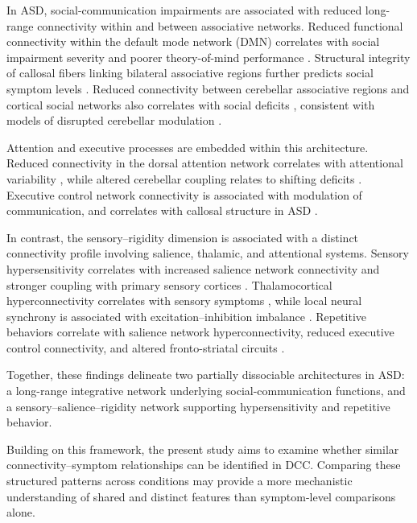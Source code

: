 \documentclass{article}
\begin{document}
In ASD, social-communication impairments are associated with reduced long-range connectivity within and between associative networks. Reduced functional connectivity within the default mode network (DMN) correlates with social impairment severity and poorer theory-of-mind performance \citep{Assaf2010,Elton2016}. Structural integrity of callosal fibers linking bilateral associative regions further predicts social symptom levels \citep{Dimond2019}. Reduced connectivity between cerebellar associative regions and cortical social networks also correlates with social deficits \citep{Ramos2019,Khan2015}, consistent with models of disrupted cerebellar modulation \citep{Belmonte2004}.

Attention and executive processes are embedded within this architecture. Reduced connectivity in the dorsal attention network correlates with attentional variability \citep{Just2007}, while altered cerebellar coupling relates to shifting deficits \citep{Rohr2019}. Executive control network connectivity is associated with modulation of communication, and correlates with callosal structure in ASD \citep{Booth2011}.

In contrast, the sensory–rigidity dimension is associated with a distinct connectivity profile involving salience, thalamic, and attentional systems. Sensory hypersensitivity correlates with increased salience network connectivity and stronger coupling with primary sensory cortices \citep{Green2015,Uddin2013}. Thalamocortical hyperconnectivity correlates with sensory symptoms \citep{Nair2013,Baran2023}, while local neural synchrony is associated with excitation–inhibition imbalance \citep{Orekhova2007}. Repetitive behaviors correlate with salience network hyperconnectivity, reduced executive control connectivity, and altered fronto-striatal circuits \citep{Langen2012}.

Together, these findings delineate two partially dissociable architectures in ASD: a long-range integrative network underlying social-communication functions, and a sensory–salience–rigidity network supporting hypersensitivity and repetitive behavior.

Building on this framework, the present study aims to examine whether similar connectivity–symptom relationships can be identified in DCC. Comparing these structured patterns across conditions may provide a more mechanistic understanding of shared and distinct features than symptom-level comparisons alone.



\end{document}

